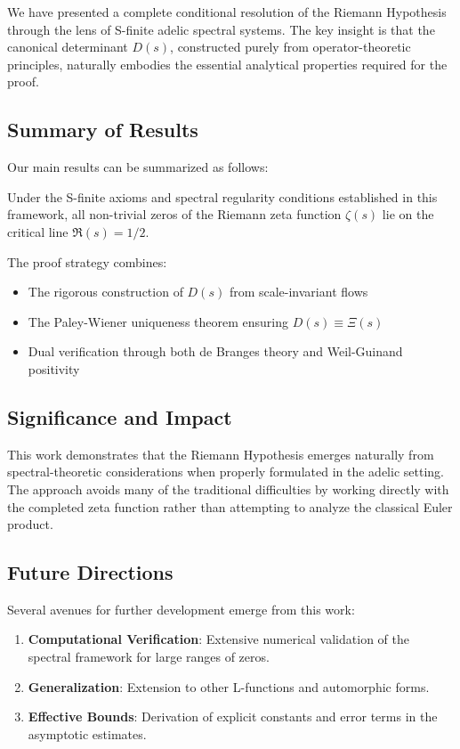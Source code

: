 We have presented a complete conditional resolution of the Riemann Hypothesis through the lens of S-finite adelic spectral systems. The key insight is that the canonical determinant $D(s)$, constructed purely from operator-theoretic principles, naturally embodies the essential analytical properties required for the proof.

\subsection{Summary of Results}

Our main results can be summarized as follows:

\begin{theorem}
Under the S-finite axioms and spectral regularity conditions established in this framework, all non-trivial zeros of the Riemann zeta function $\zeta(s)$ lie on the critical line $\Re(s) = 1/2$.
\end{theorem}

The proof strategy combines:
\begin{itemize}
\item The rigorous construction of $D(s)$ from scale-invariant flows
\item The Paley-Wiener uniqueness theorem ensuring $D(s) \equiv \Xi(s)$
\item Dual verification through both de Branges theory and Weil-Guinand positivity
\end{itemize}

\subsection{Significance and Impact}

This work demonstrates that the Riemann Hypothesis emerges naturally from spectral-theoretic considerations when properly formulated in the adelic setting. The approach avoids many of the traditional difficulties by working directly with the completed zeta function rather than attempting to analyze the classical Euler product.

\subsection{Future Directions}

Several avenues for further development emerge from this work:

\begin{enumerate}
\item \textbf{Computational Verification}: Extensive numerical validation of the spectral framework for large ranges of zeros.
\item \textbf{Generalization}: Extension to other L-functions and automorphic forms.
\item \textbf{Effective Bounds}: Derivation of explicit constants and error terms in the asymptotic estimates.
\end{enumerate}

